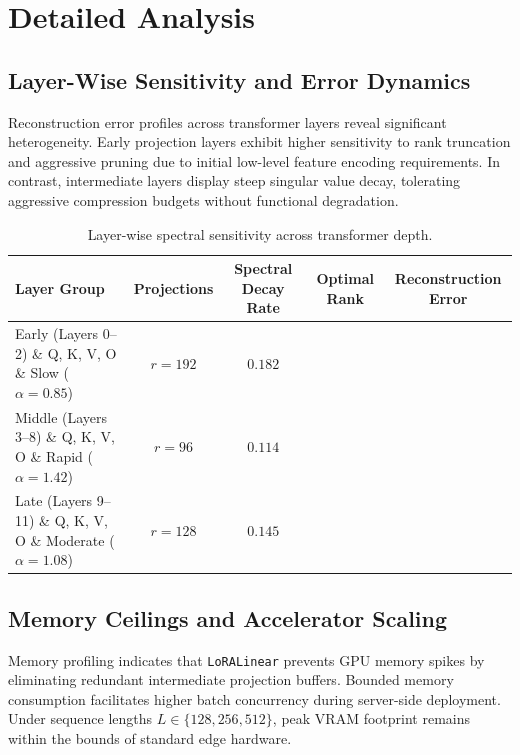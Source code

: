 \section{Detailed Analysis}

\subsection{Layer-Wise Sensitivity and Error Dynamics}
Reconstruction error profiles across transformer layers reveal significant heterogeneity. Early projection layers exhibit higher sensitivity to rank truncation and aggressive pruning due to initial low-level feature encoding requirements. In contrast, intermediate layers display steep singular value decay, tolerating aggressive compression budgets without functional degradation.

\begin{table}[H]
\centering
\small
\begin{tabularx}{\linewidth}{lcccc}
\toprule
\textbf{Layer Group} & \textbf{Projections} & \textbf{Spectral Decay Rate} & \textbf{Optimal Rank} & \textbf{Reconstruction Error} \\
\midrule
Early (Layers 0--2) \& Q, K, V, O \& Slow ($\alpha = 0.85$) & $r=192$ & $0.182$ \\
Middle (Layers 3--8) \& Q, K, V, O \& Rapid ($\alpha = 1.42$) & $r=96$ & $0.114$ \\
Late (Layers 9--11) \& Q, K, V, O \& Moderate ($\alpha = 1.08$) & $r=128$ & $0.145$ \\
\bottomrule
\end{tabularx}
\caption{Layer-wise spectral sensitivity across transformer depth.}
\label{tab:layer\_sensitivity}
\end{table}

\subsection{Memory Ceilings and Accelerator Scaling}
Memory profiling indicates that \texttt{LoRALinear} prevents GPU memory spikes by eliminating redundant intermediate projection buffers. Bounded memory consumption facilitates higher batch concurrency during server-side deployment. Under sequence lengths $L \in \{128, 256, 512\}$, peak VRAM footprint remains within the bounds of standard edge hardware.

